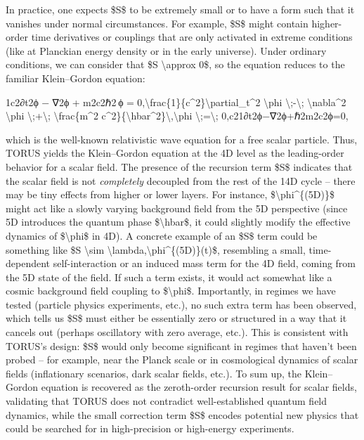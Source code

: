 \documentclass[
]{article}
\begin{document}
In practice, one expects \$S\$ to be extremely small or to have a form
such that it vanishes under normal circumstances. For example, \$S\$
might contain higher-order time derivatives or couplings that are only
activated in extreme conditions (like at Planckian energy density or in
the early universe). Under ordinary conditions, we can consider that \$S
\textbackslash approx 0\$, so the equation reduces to the familiar
Klein--Gordon equation:

1c2∂t2ϕ  −  ∇2ϕ  +  m2c2ℏ2 ϕ  =  0,\textbackslash frac\{1\}\{c\^{}2\}\textbackslash partial\_t\^{}2
\textbackslash phi \textbackslash;-\textbackslash;
\textbackslash nabla\^{}2 \textbackslash phi
\textbackslash;+\textbackslash; \textbackslash frac\{m\^{}2
c\^{}2\}\{\textbackslash hbar\^{}2\}\textbackslash,\textbackslash phi
\textbackslash;=\textbackslash;
0,c21\hspace{0pt}∂t2\hspace{0pt}ϕ−∇2ϕ+ℏ2m2c2\hspace{0pt}ϕ=0,

which is the well-known relativistic wave equation for a free scalar
particle. Thus, TORUS yields the Klein--Gordon equation at the 4D level
as the leading-order behavior for a scalar field. The presence of the
recursion term \$S\$ indicates that the scalar field is not
\emph{completely} decoupled from the rest of the 14D cycle -- there may
be tiny effects from higher or lower layers. For instance,
\$\textbackslash phi\^{}\{(5D)\}\$ might act like a slowly varying
background field from the 5D perspective (since 5D introduces the
quantum phase \$\textbackslash hbar\$, it could slightly modify the
effective dynamics of \$\textbackslash phi\$ in 4D). A concrete example
of an \$S\$ term could be something like \$S \textbackslash sim
\textbackslash lambda,\textbackslash phi\^{}\{(5D)\}(t)\$, resembling a
small, time-dependent self-interaction or an induced mass term for the
4D field, coming from the 5D state of the field. If such a term exists,
it would act somewhat like a cosmic background field coupling to
\$\textbackslash phi\$. Importantly, in regimes we have tested (particle
physics experiments, etc.), no such extra term has been observed, which
tells us \$S\$ must either be essentially zero or structured in a way
that it cancels out (perhaps oscillatory with zero average, etc.). This
is consistent with TORUS's design: \$S\$ would only become significant
in regimes that haven't been probed -- for example, near the Planck
scale or in cosmological dynamics of scalar fields (inflationary
scenarios, dark scalar fields, etc.). To sum up, the Klein--Gordon
equation is recovered as the zeroth-order recursion result for scalar
fields, validating that TORUS does not contradict well-established
quantum field dynamics, while the small correction term \$S\$ encodes
potential new physics that could be searched for in high-precision or
high-energy experiments.
\end{document}
